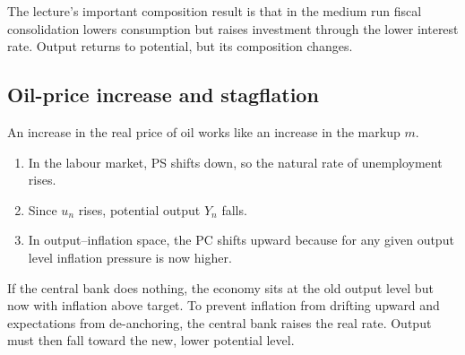 \documentclass[12pt]{article}
\begin{document}
\begin{policynote}
The lecture's important composition result is that in the medium run fiscal consolidation lowers consumption but raises investment through the lower interest rate. Output returns to potential, but its composition changes.
\end{policynote}

\subsection{Oil-price increase and stagflation}

An increase in the real price of oil works like an increase in the markup $m$.

\begin{enumerate}[leftmargin=1.5em]
\item In the labour market, PS shifts down, so the natural rate of unemployment rises.
\item Since $u_n$ rises, potential output $Y_n$ falls.
\item In output--inflation space, the PC shifts upward because for any given output level inflation pressure is now higher.
\end{enumerate}

If the central bank does nothing, the economy sits at the old output level but now with inflation above target. To prevent inflation from drifting upward and expectations from de-anchoring, the central bank raises the real rate. Output must then fall toward the new, lower potential level.

\begin{center}
\end{center}
\end{document}
